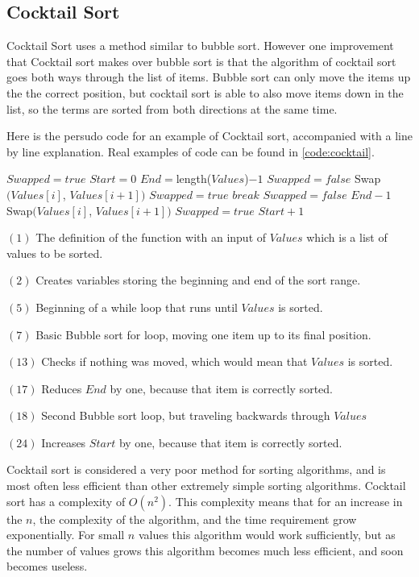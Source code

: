 \documentclass{article}
\begin{document}
\subsection{Cocktail Sort}
\begin{multicols}{2}
Cocktail Sort uses a method similar to bubble sort. However one improvement that Cocktail sort makes over bubble sort is that the algorithm of cocktail sort goes both ways through the list of items. Bubble sort can only move the items up the the correct position, but cocktail sort is able to also move items down in the list, so the terms are sorted from both directions at the same time.

Here is the persudo code for an example of Cocktail sort, accompanied with a line by line explanation. Real examples of code can be found in \ref{code:cocktail}.
\end{multicols}
\begin{algorithmic}
\State $Swapped=true$
\State $Start=0$
\State $End=$length($Values$)$-1$
\State $Swapped=false$
\State Swap$(Values[i]$, $Values[i+1])$
\State $Swapped=true$
\EndIf
\EndFor
{}
\State $break$
\EndIf
\State $Swapped=false$
\State $End-1$
\State Swap$(Values[i]$, $Values[i+1])$
\State $Swapped=true$
\EndIf
\EndFor
\State $Start+1$
\EndWhile
\EndFunction
\end{algorithmic}
\begin{multicols}{2}
$(1)$ The definition of the function with an input of $Values$ which is a list of values to be sorted.

$(2)$ Creates variables storing the beginning and end of the sort range.

$(5)$ Beginning of a while loop that runs until $Values$ is sorted.

$(7)$  Basic Bubble sort for loop, moving one item up to its final position.

$(13)$ Checks if nothing was moved, which would mean that $Values$ is sorted.

$(17)$ Reduces $End$ by one, because that item is correctly sorted.

$(18)$ Second Bubble sort loop, but traveling backwards through $Values$

$(24)$ Increases $Start$ by one, because that item is correctly sorted.
\end{multicols}
\begin{multicols}{2}
Cocktail sort is considered a very poor method for sorting algorithms, and is most often less efficient than other extremely simple sorting algorithms. Cocktail sort has a complexity of $O(n^2)$. This complexity means that for an increase in the $n$, the complexity of the algorithm, and the time requirement grow exponentially. For small $n$ values this algorithm would work sufficiently, but as the number of values grows this algorithm becomes much less efficient, and soon becomes useless.
\end{multicols}
\end{document}
